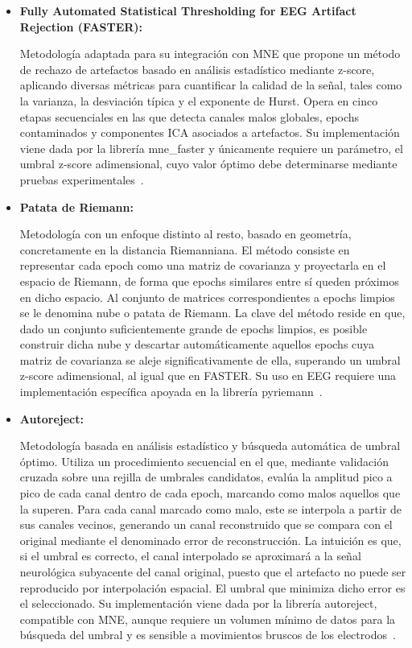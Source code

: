 \begin{itemize}
    \item \textbf{Fully Automated Statistical Thresholding for EEG Artifact Rejection (FASTER):}

        Metodología adaptada para su integración con MNE que propone un método de rechazo de artefactos basado en análisis estadístico mediante z-score, aplicando diversas métricas para cuantificar la calidad de la señal, tales como la varianza, la desviación típica y el exponente de Hurst. Opera en cinco etapas secuenciales en las que detecta canales malos globales, epochs contaminados y componentes ICA asociados a artefactos. Su implementación viene dada por la librería mne\_faster y únicamente requiere un parámetro, el umbral z-score adimensional, cuyo valor óptimo debe determinarse mediante pruebas experimentales~\cite{nolan2010faster}.
    
    \item \textbf{Patata de Riemann:}

        Metodología con un enfoque distinto al resto, basado en geometría, concretamente en la distancia Riemanniana. El método consiste en representar cada epoch como una matriz de covarianza y proyectarla en el espacio de Riemann, de forma que epochs similares entre sí queden próximos en dicho espacio. Al conjunto de matrices correspondientes a epochs limpios se le denomina nube o patata de Riemann. La clave del método reside en que, dado un conjunto suficientemente grande de epochs limpios, es posible construir dicha nube y descartar automáticamente aquellos epochs cuya matriz de covarianza se aleje significativamente de ella, superando un umbral z-score adimensional, al igual que en FASTER. Su uso en EEG requiere una implementación específica apoyada en la librería pyriemann~\cite{hajhassani2026improved}.

    \item \textbf{Autoreject:}

        Metodología basada en análisis estadístico y búsqueda automática de umbral óptimo. Utiliza un procedimiento secuencial en el que, mediante validación cruzada sobre una rejilla de umbrales candidatos, evalúa la amplitud pico a pico de cada canal dentro de cada epoch, marcando como malos aquellos que la superen. Para cada canal marcado como malo, este se interpola a partir de sus canales vecinos, generando un canal reconstruido que se compara con el original mediante el denominado error de reconstrucción. La intuición es que, si el umbral es correcto, el canal interpolado se aproximará a la señal neurológica subyacente del canal original, puesto que el artefacto no puede ser reproducido por interpolación espacial. El umbral que minimiza dicho error es el seleccionado. Su implementación viene dada por la librería autoreject, compatible con MNE, aunque requiere un volumen mínimo de datos para la búsqueda del umbral y es sensible a movimientos bruscos de los electrodos~\cite{jas2017autoreject}.

\end{itemize}


